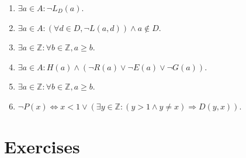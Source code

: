 \documentclass{article}
\begin{document}
\begin{enumerate}[label=\alph*)]
    \item 
    $\exists a \in A : \lnot L_D(a)$.
    
    \item
    $\exists a \in A : (\forall d \in D, \lnot L(a,d)) \land a \notin D$.
    
    
    
    \item
    $\exists a \in \mathbb{Z} : \forall b \in \mathbb{Z}, a \geq b$.
    
    \item
    $\exists a \in A : H(a) \land (\lnot R(a) \lor \lnot E(a) \lor \lnot G(a))$.
    
    \item
    $\exists a \in \mathbb{Z} : \forall b \in \mathbb{Z}, a \geq b$.
    
    \item
    $\lnot P(x) \Leftrightarrow x < 1 \lor (\exists y \in \mathbb{Z} : (y>1 \land y \neq x) \Rightarrow D(y,x))$. 
    
    
    
    

\end{enumerate}


\section{Exercises}
\end{document}
